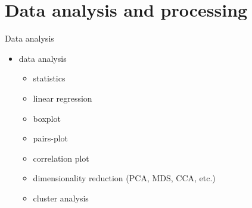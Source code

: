 \documentclass[8pt,ignorenonframetext,]{beamer}
\providecommand{\tightlist}{%
  \setlength{\itemsep}{0pt}\setlength{\parskip}{0pt}}
\begin{document}
\section{Data analysis and
processing}\label{data-analysis-and-processing}

\begin{frame}{Data analysis}

\begin{itemize}
\tightlist
\item
  data analysis

  \begin{itemize}
  \tightlist
  \item
    statistics
  \item
    linear regression
  \item
    boxplot
  \item
    pairs-plot
  \item
    correlation plot
  \item
    dimensionality reduction (PCA, MDS, CCA, etc.)
  \item
    cluster analysis
  \end{itemize}
\end{itemize}

\end{frame}
\end{document}

